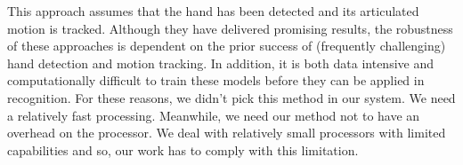 This approach assumes that the hand has been detected and its articulated motion is tracked. 
Although they have delivered promising results, the robustness of these approaches is dependent 
on the prior success of (frequently challenging) hand detection and motion tracking. In addition, 
it is both data intensive and computationally difficult to train these models before they can be 
applied in recognition. For these reasons, we didn’t pick this method in our system. We need a 
relatively fast processing. Meanwhile, we need our method not to have an overhead on the 
processor. We deal with relatively small processors with limited capabilities and so, our work has 
to comply with this limitation.
\bigskip